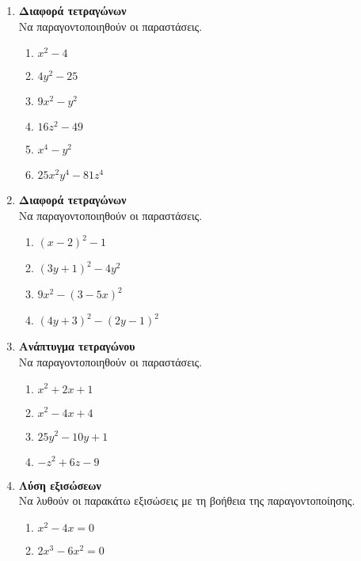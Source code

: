 \documentclass[twoside,nofonts,internet]{askhseis}
\begin{document}
\begin{enumerate}
\begin{enumerate}[itemsep=0mm,label=\roman*.]
\end{enumerate}
\item \textbf{Διαφορά τετραγώνων}\\
Να παραγοντοποιηθούν οι παραστάσεις.
\begin{multicols}{2}
\begin{enumerate}[itemsep=0mm,label=\roman*.
,leftmargin=3mm]
\item $ x^2-4 $
\item $ 4y^2-25 $
\item $ 9x^2-y^2 $
\item $ 16z^2-49 $
\item $ x^4-y^2 $
\item $ 25x^2y^4-81z^4 $
\end{enumerate}
\end{multicols}
\item \textbf{Διαφορά τετραγώνων}\\
Να παραγοντοποιηθούν οι παραστάσεις.
\begin{multicols}{2}
\begin{enumerate}[itemsep=0mm,label=\roman*.
,leftmargin=3mm]
\item $ (x-2)^2-1 $
\item $ (3y+1)^2-4y^2 $
\item $ 9x^2-(3-5x)^2 $
\item $ (4y+3)^2-(2y-1)^2 $
\end{enumerate}
\end{multicols}
\item \textbf{Ανάπτυγμα τετραγώνου}\\
Να παραγοντοποιηθούν οι παραστάσεις.
\begin{multicols}{2}
\begin{enumerate}[itemsep=0mm,label=\roman*.]
\item $ x^2+2x+1 $
\item $ x^2-4x+4 $
\item $ 25y^2-10y+1 $
\item $ -z^2+6z-9 $
\end{enumerate}
\end{multicols}
\item \textbf{Λύση εξισώσεων}\\
Να λυθούν οι παρακάτω εξισώσεις με τη βοήθεια της παραγοντοποίησης.
\begin{multicols}{2}
\begin{enumerate}[itemsep=0mm,label=\roman*.]
\item $ x^2-4x=0 $
\item $ 2x^3-6x^2=0 $

\end{enumerate}
\end{multicols}
\end{enumerate}
\end{document}
